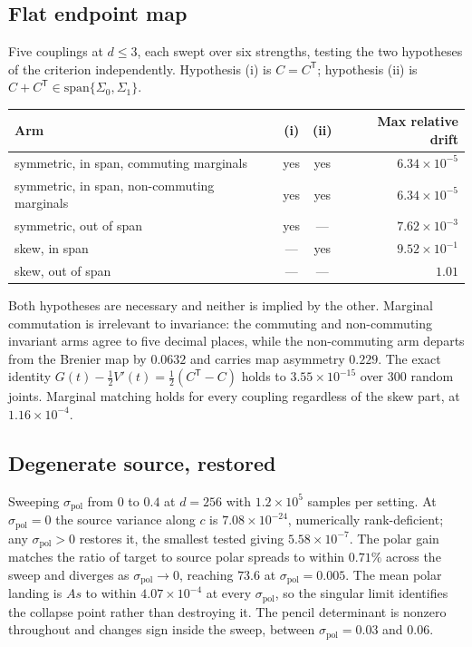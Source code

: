 \documentclass[11pt]{article}
\newcommand{\T}{\mathsf{T}}
\begin{document}
\subsection{Flat endpoint map}
\label{sec:flat}

Five couplings at $d\le 3$, each swept over six strengths, testing the two hypotheses of the
criterion independently. Hypothesis (i) is $C=C^{\T}$; hypothesis (ii) is
$C+C^{\T}\in\mathrm{span}\{\Sigma_0,\Sigma_1\}$.

\begin{center}
\begin{tabular}{@{}lccr@{}}
\toprule
Arm & (i) & (ii) & Max relative drift\\
\midrule
symmetric, in span, commuting marginals & yes & yes & $6.34\times10^{-5}$\\
symmetric, in span, non-commuting marginals & yes & yes & $6.34\times10^{-5}$\\
symmetric, out of span & yes & --- & $7.62\times10^{-3}$\\
skew, in span & --- & yes & $9.52\times10^{-1}$\\
skew, out of span & --- & --- & $1.01$\\
\bottomrule
\end{tabular}
\end{center}

Both hypotheses are necessary and neither is implied by the other. Marginal commutation is
irrelevant to invariance: the commuting and non-commuting invariant arms agree to five decimal
places, while the non-commuting arm departs from the Brenier map by $0.0632$ and carries map
asymmetry $0.229$. The exact identity
$G(t)-\tfrac12V'(t)=\tfrac12(C^{\T}-C)$ holds to $3.55\times10^{-15}$ over $300$ random joints.
Marginal matching holds for every coupling regardless of the skew part, at
$1.16\times10^{-4}$.

\subsection{Degenerate source, restored}

Sweeping $\sigma_{\mathrm{pol}}$ from $0$ to $0.4$ at $d=256$ with $1.2\times10^{5}$ samples per
setting. At $\sigma_{\mathrm{pol}}=0$ the source variance along $c$ is $7.08\times10^{-24}$,
numerically rank-deficient; any $\sigma_{\mathrm{pol}}>0$ restores it, the smallest tested giving
$5.58\times10^{-7}$. The polar gain matches the ratio of target to source polar spreads to within
$0.71\%$ across the sweep and diverges as $\sigma_{\mathrm{pol}}\to0$, reaching $73.6$ at
$\sigma_{\mathrm{pol}}=0.005$. The mean polar landing is $As$ to within $4.07\times10^{-4}$ at
every $\sigma_{\mathrm{pol}}$, so the singular limit identifies the collapse point rather than
destroying it. The pencil determinant is nonzero throughout and changes sign inside the sweep,
between $\sigma_{\mathrm{pol}}=0.03$ and $0.06$.
\end{document}
